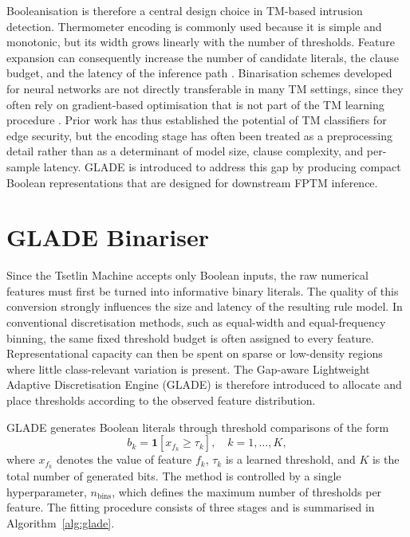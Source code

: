 \documentclass[journal,twoside,web]{ieeecolor}
\begin{document}
Booleanisation is therefore a central design choice in TM-based intrusion detection. Thermometer encoding is commonly used because it is simple and monotonic, but its width grows linearly with the number of thresholds. Feature expansion can consequently increase the number of candidate literals, the clause budget, and the latency of the inference path \cite{granmo2018tsetlin, gunvaldsen2023iot}. Binarisation schemes developed for neural networks are not directly transferable in many TM settings, since they often rely on gradient-based optimisation that is not part of the TM learning procedure \cite{nguyen2025binarized}. Prior work has thus established the potential of TM classifiers for edge security, but the encoding stage has often been treated as a preprocessing detail rather than as a determinant of model size, clause complexity, and per-sample latency. GLADE is introduced to address this gap by producing compact Boolean representations that are designed for downstream FPTM inference.


\section{GLADE Binariser}
\label{sec:glade}

Since the Tsetlin Machine accepts only Boolean inputs, the raw
numerical features must first be turned into informative binary
literals. The quality of this conversion strongly influences the
size and latency of the resulting rule model. In conventional
discretisation methods, such as equal-width and equal-frequency
binning, the same fixed threshold budget is often assigned to every
feature. Representational capacity can then be spent on sparse or
low-density regions where little class-relevant variation is present.
The Gap-aware Lightweight Adaptive Discretisation Engine (GLADE) is
therefore introduced to allocate and place thresholds according to the
observed feature distribution.

GLADE generates Boolean literals through threshold comparisons of
the form
\begin{equation}
  b_k = \mathbf{1}\!\left[ x_{f_k} \geq \tau_k \right],
  \quad k = 1, \ldots, K,
\end{equation}
where $x_{f_k}$ denotes the value of feature $f_k$, $\tau_k$ is a
learned threshold, and $K$ is the total number of generated bits.
The method is controlled by a single hyperparameter,
$n_\text{bins}$, which defines the maximum number of thresholds per
feature. The fitting procedure consists of three stages and is
summarised in Algorithm~\ref{alg:glade}.
\end{document}
